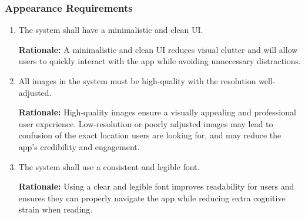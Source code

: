 \documentclass[]{article}
\begin{document}
\subsubsection{Appearance Requirements}
\label{ssub:appearance_requirements}
\begin{enumerate}[{LF-A}1. ]
	\item The system shall have a minimalistic and clean UI.
	
	{\bf Rationale:} A minimalistic and clean UI reduces visual clutter and will allow users to quickly interact with the app while avoiding unnecessary distractions.
	\item All images in the system must be high-quality with the resolution well-adjusted.
	
	{\bf Rationale:} High-quality images ensure a visually appealing and professional user experience. Low-resolution or poorly adjusted images may lead to confusion of the exact location users are looking for, and may reduce the app's credibility and engagement.
	\item The system shall use a consistent and legible font.
	
	{\bf Rationale:} Using a clear and legible font improves readability for users and ensures they can properly navigate the app while reducing extra cognitive strain when reading.
\end{enumerate}
\end{document}
